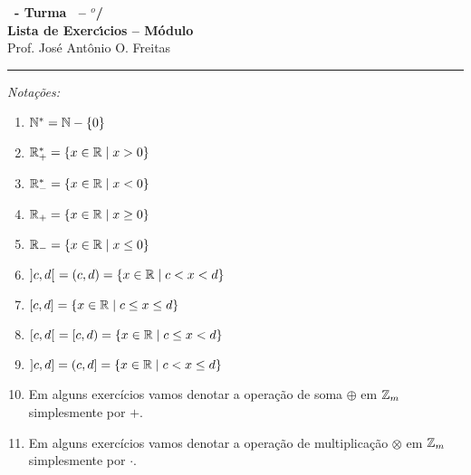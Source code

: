 \documentclass[12pt]{exam}
\begin{document}
    \begin{center}
    {\Large\bf \disciplina\ - Turma \turma\ -- \semestre$^{o}$/\ano} \\ \vspace{9pt} {\large\bf
        Lista de Exerc{\'\i}cios -- Módulo \numeromodulo}\\ \vspace{9pt} Prof. Jos{\'e} Ant{\^o}nio O. Freitas
    \end{center}
    
    \hrule

    \vspace{.6cm}

    \begin{center}
        \textit{Nota\c{c}\~oes:}
    \end{center}
    \begin{multicols}{2}
        \begin{enumerate}[label={\roman*})]
            \item $\mathbb{N}^* = \mathbb{N} - \{0\}$

            \item $\mathbb{R}^*_+ = \{x \in \mathbb{R} \mid x > 0\}$

            \item $\mathbb{R}^*_- = \{x \in \mathbb{R} \mid x < 0\}$

            \item $\mathbb{R}_+ = \{x \in \mathbb{R} \mid x \ge 0\}$

            \item $\mathbb{R}_- = \{x \in \mathbb{R} \mid x \le 0\}$

            \item $]c,d[\ = (c,d) = \{x \in \mathbb{R} \mid c < x < d\}$

            \item $[c,d] = \{x \in \mathbb{R} \mid c \le x \le d\}$

            \item $[c,d[\ = [c, d) = \{x \in \mathbb{R} \mid c \le x < d\}$

            \item $]c,d] = (c, d] = \{x \in \mathbb{R} \mid c < x \le d\}$

            \item Em alguns exercícios vamos denotar a opera\c{c}\~ao de soma $\oplus$ em $\mathbb{Z}_m$ simplesmente por $+$.

            \item Em alguns exercícios vamos denotar a opera\c{c}\~ao de multiplica\c{c}\~ao $\otimes$ em $\mathbb{Z}_m$ simplesmente por $\cdot$.

        \end{enumerate}
    \end{multicols}
\end{document}
